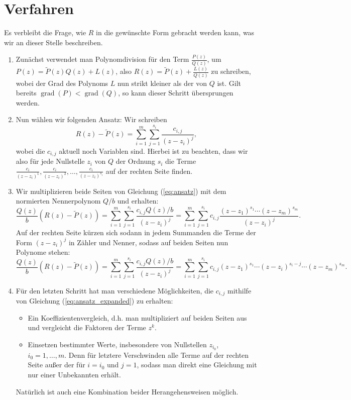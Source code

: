 \documentclass{article}
\theoremstyle{plain}
\theoremstyle{definition}
\begin{document}
\section{Verfahren}
Es verbleibt die Frage, wie $R$ in die gewünschte Form gebracht werden kann, was wir an dieser Stelle beschreiben.
\begin{enumerate}
	\item Zunächst verwendet man Polynomdivision für den Term $\frac{P(z)}{Q(z)}$, um $P(z) = \tilde{P}(z) Q(z) + L(z)$, also $R(z) = \tilde{P}(z) + \frac{L(z)}{Q(z)}$ zu schreiben, wobei der Grad des Polynoms $L$ nun strikt kleiner als der von $Q$ ist.
	      Gilt bereits $\operatorname{grad}(P) < \operatorname{grad}(Q)$, so kann dieser Schritt übersprungen werden.
	\item Nun wählen wir folgenden Ansatz: Wir schreiben
	      \begin{equation}\label{eq:ansatz}
		      R(z) - \tilde{P}(z) = \sum_{i=1}^{m} \sum_{j=1}^{s_i} \frac{c_{i,j}}{(z - z_i)^{j}},
	      \end{equation}
	      wobei die $c_{i, j}$ aktuell noch Variablen sind.
	      Hierbei ist zu beachten, dass wir also für jede Nullstelle $z_i$ von $Q$ der Ordnung $s_i$ die Terme $\frac{c_i}{(z - z_i)^1}, \frac{c_i}{(z - z_i)^2}, \dots, \frac{c_i}{(z - z_i)^{s_i}}$ auf der rechten Seite finden.
	\item Wir multiplizieren beide Seiten von Gleichung (\ref{eq:ansatz}) mit dem normierten Nennerpolynom $Q/b$ und erhalten:
	      \[
		      \frac{Q(z)}{b} (R(z) - \tilde{P}(z)) = \sum_{i=1}^{m} \sum_{j=1}^{s_i} \frac{c_{i, j} Q(z)/b}{(z - z_i)^j} = \sum_{i=1}^{m} \sum_{j=1}^{s_i} c_{i, j} \frac{(z - z_1)^{s_1} \cdots (z - z_m)^{s_m}}{(z - z_i)^j}.
	      \]
	      Auf der rechten Seite kürzen sich sodann in jedem Summanden die Terme der Form $(z - z_i)^j$ in Zähler und Nenner, sodass auf beiden Seiten nun Polynome stehen:
	      \begin{equation}\label{eq:ansatz_expanded}
		      \frac{Q(z)}{b} (R(z) - \tilde{P}(z)) = \sum_{i=1}^{m} \sum_{j=1}^{s_i} \frac{c_{i, j} Q(z)/b}{(z - z_i)^j} = \sum_{i=1}^{m} \sum_{j=1}^{s_i} c_{i, j} (z - z_1)^{s_1} \cdots (z - z_i)^{s_i - j} \cdots (z - z_m)^{s_m}.
	      \end{equation}
	\item Für den letzten Schritt hat man verschiedene Möglichkeiten, die $c_{i, j}$ mithilfe von Gleichung (\ref{eq:ansatz_expanded}) zu erhalten:
	      \begin{itemize}
		      \item Ein Koeffizientenvergleich, d.h. man multipliziert auf beiden Seiten aus und vergleicht die Faktoren der Terme $z^k$.
		      \item Einsetzen bestimmter Werte, insbesondere von Nullstellen $z_{i_0}$, $i_0 = 1, \dots, m$.
		            Denn für letztere Verschwinden alle Terme auf der rechten Seite außer der für $i = i_0$ und $j = 1$, sodass man direkt eine Gleichung mit nur einer Unbekannten erhält.
	      \end{itemize}
	      Natürlich ist auch eine Kombination beider Herangehensweisen möglich.
\end{enumerate}
\end{document}
